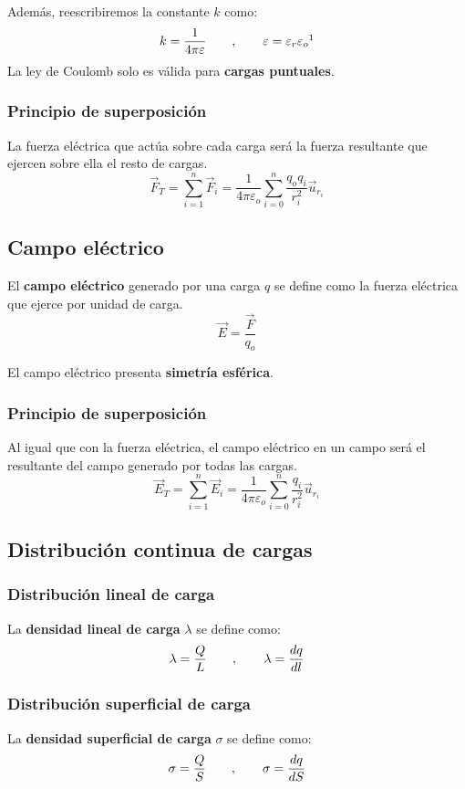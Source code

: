 \documentclass[a4paper]{book}
\begin{document}
Además, reescribiremos la constante $k$ como:
\[k= \frac{1}{4\pi\varepsilon} \qquad ,\qquad \varepsilon = \varepsilon _r \varepsilon _o \footnotemark\]
La ley de Coulomb solo es válida para \textbf{cargas puntuales}.

\subsubsection{Principio de superposición}
La fuerza eléctrica que actúa sobre cada carga será la fuerza resultante que ejercen sobre ella el resto de cargas.
\[\vec{F}_T = \sum_{i=1}^{n}{\vec{F}_i} = \frac{1}{4\pi\varepsilon_o}\sum^{n}_{i=0}{\frac{q_oq_i}{r_i^2}\vec{u}_{r_{i}}}\]


\subsection{Campo eléctrico}
El \textbf{campo eléctrico} generado por una carga $q$ se define como la fuerza eléctrica que ejerce  por unidad de carga.
\[\boxed{\vec{E}=\frac{\vec{F}}{q_o}}\]

El campo eléctrico presenta \textbf{simetría esférica}.
\subsubsection{Principio de superposición}
Al igual que con la fuerza eléctrica, el campo eléctrico en un campo será el resultante del campo generado por todas las cargas.
\[\vec{E}_T = \sum_{i=1}^{n}{\vec{E}_i} = \frac{1}{4\pi\varepsilon_o}\sum^{n}_{i=0}{\frac{q_i}{r_i^2}\vec{u}_{r_{i}}}\]

\subsection{Distribución continua de cargas}
\subsubsection{Distribución lineal de carga}
La \textbf{densidad lineal de carga} $\lambda$ se define como:
\[\lambda = \frac{Q}{L}\qquad ,\qquad \lambda = \dv{q}{l}\]
\subsubsection{Distribución superficial de carga}
La \textbf{densidad superficial de carga} $\sigma$ se define como:
\[\sigma = \frac{Q}{S}\qquad ,\qquad \sigma = \dv{q}{S}\]
\end{document}
